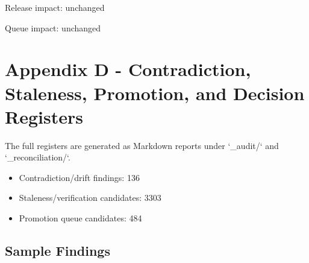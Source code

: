 \documentclass[11pt,a4paper]{report}
\begin{document}
Release impact: unchanged

Queue impact: unchanged


\chapter{Appendix D - Contradiction, Staleness, Promotion, and Decision Registers}

The full registers are generated as Markdown reports under `\_audit/\allowbreak{}` and `\_reconciliation/\allowbreak{}`.\allowbreak{}


\begin{itemize}
\item Contradiction/\allowbreak{}drift findings: 136
\item Staleness/\allowbreak{}verification candidates: 3303
\item Promotion queue candidates: 484
\end{itemize}

\section{Sample Findings}
\end{document}
